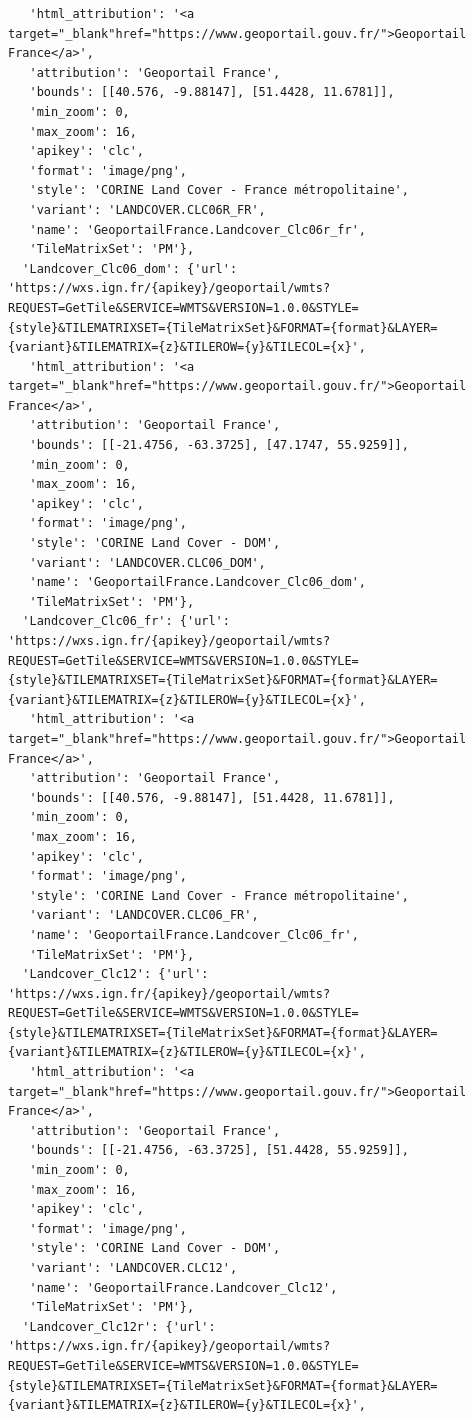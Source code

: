 \documentclass[
  letterpaper,
  DIV=11,
  numbers=noendperiod]{scrreprt}
\begin{document}
\begin{verbatim}
   'html_attribution': '<a target="_blank"href="https://www.geoportail.gouv.fr/">Geoportail France</a>',
   'attribution': 'Geoportail France',
   'bounds': [[40.576, -9.88147], [51.4428, 11.6781]],
   'min_zoom': 0,
   'max_zoom': 16,
   'apikey': 'clc',
   'format': 'image/png',
   'style': 'CORINE Land Cover - France métropolitaine',
   'variant': 'LANDCOVER.CLC06R_FR',
   'name': 'GeoportailFrance.Landcover_Clc06r_fr',
   'TileMatrixSet': 'PM'},
  'Landcover_Clc06_dom': {'url': 'https://wxs.ign.fr/{apikey}/geoportail/wmts?REQUEST=GetTile&SERVICE=WMTS&VERSION=1.0.0&STYLE={style}&TILEMATRIXSET={TileMatrixSet}&FORMAT={format}&LAYER={variant}&TILEMATRIX={z}&TILEROW={y}&TILECOL={x}',
   'html_attribution': '<a target="_blank"href="https://www.geoportail.gouv.fr/">Geoportail France</a>',
   'attribution': 'Geoportail France',
   'bounds': [[-21.4756, -63.3725], [47.1747, 55.9259]],
   'min_zoom': 0,
   'max_zoom': 16,
   'apikey': 'clc',
   'format': 'image/png',
   'style': 'CORINE Land Cover - DOM',
   'variant': 'LANDCOVER.CLC06_DOM',
   'name': 'GeoportailFrance.Landcover_Clc06_dom',
   'TileMatrixSet': 'PM'},
  'Landcover_Clc06_fr': {'url': 'https://wxs.ign.fr/{apikey}/geoportail/wmts?REQUEST=GetTile&SERVICE=WMTS&VERSION=1.0.0&STYLE={style}&TILEMATRIXSET={TileMatrixSet}&FORMAT={format}&LAYER={variant}&TILEMATRIX={z}&TILEROW={y}&TILECOL={x}',
   'html_attribution': '<a target="_blank"href="https://www.geoportail.gouv.fr/">Geoportail France</a>',
   'attribution': 'Geoportail France',
   'bounds': [[40.576, -9.88147], [51.4428, 11.6781]],
   'min_zoom': 0,
   'max_zoom': 16,
   'apikey': 'clc',
   'format': 'image/png',
   'style': 'CORINE Land Cover - France métropolitaine',
   'variant': 'LANDCOVER.CLC06_FR',
   'name': 'GeoportailFrance.Landcover_Clc06_fr',
   'TileMatrixSet': 'PM'},
  'Landcover_Clc12': {'url': 'https://wxs.ign.fr/{apikey}/geoportail/wmts?REQUEST=GetTile&SERVICE=WMTS&VERSION=1.0.0&STYLE={style}&TILEMATRIXSET={TileMatrixSet}&FORMAT={format}&LAYER={variant}&TILEMATRIX={z}&TILEROW={y}&TILECOL={x}',
   'html_attribution': '<a target="_blank"href="https://www.geoportail.gouv.fr/">Geoportail France</a>',
   'attribution': 'Geoportail France',
   'bounds': [[-21.4756, -63.3725], [51.4428, 55.9259]],
   'min_zoom': 0,
   'max_zoom': 16,
   'apikey': 'clc',
   'format': 'image/png',
   'style': 'CORINE Land Cover - DOM',
   'variant': 'LANDCOVER.CLC12',
   'name': 'GeoportailFrance.Landcover_Clc12',
   'TileMatrixSet': 'PM'},
  'Landcover_Clc12r': {'url': 'https://wxs.ign.fr/{apikey}/geoportail/wmts?REQUEST=GetTile&SERVICE=WMTS&VERSION=1.0.0&STYLE={style}&TILEMATRIXSET={TileMatrixSet}&FORMAT={format}&LAYER={variant}&TILEMATRIX={z}&TILEROW={y}&TILECOL={x}',

\end{verbatim}
\end{document}
